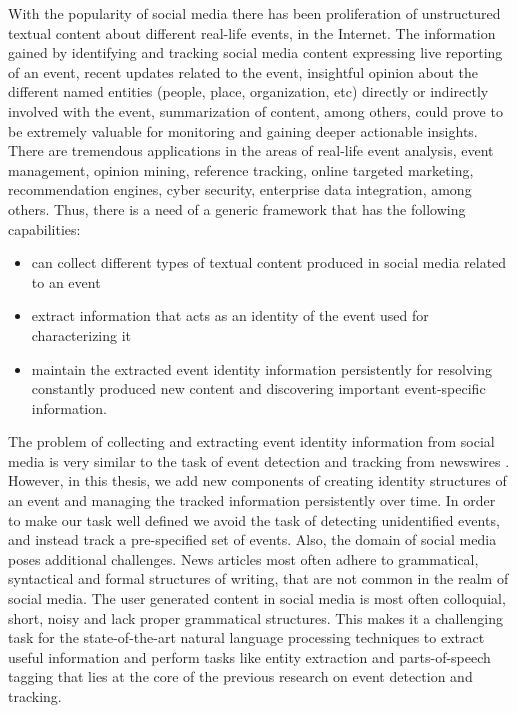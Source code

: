With the popularity of social media there has been proliferation of unstructured textual content about different real-life events, in the Internet.
The information gained by identifying and tracking social media content expressing live reporting of an event, recent updates related to the event, insightful opinion about the different named entities (people, place, organization, etc) directly or indirectly involved with the event, summarization of content, among others, could prove to be extremely valuable for monitoring and gaining deeper actionable insights. There are tremendous applications in the areas of real-life event analysis, event management, opinion mining, reference tracking, online targeted marketing, recommendation engines, cyber security, enterprise data integration, among others. Thus, there is a need of a generic framework that has the following capabilities:
\begin{itemize}
\item can collect different types of textual content produced in social media related to an event
\item extract information that acts as an identity of the event used for characterizing it
\item maintain the extracted event identity information persistently for resolving constantly produced new content and discovering important event-specific information. 
\end{itemize}


The problem of collecting and extracting event identity information from social media is very similar to the task of event detection and tracking from newswires \cite{allan1998line,kumaran2004text}. However, in this thesis, we add new components of creating identity structures of an event and managing the tracked information persistently over time. In order to make our task well defined we avoid the task of detecting unidentified events, and instead track a pre-specified set of events. Also, the domain of social media poses additional challenges. News articles most often adhere to grammatical, syntactical and formal structures of writing, that are not common in the realm of social media. The user generated content in social media is most often colloquial, short, noisy and lack proper grammatical structures. This makes it a challenging task for the state-of-the-art natural language processing techniques to extract useful information and perform tasks like entity extraction and parts-of-speech tagging that lies at the core of the previous research on event detection and tracking.


